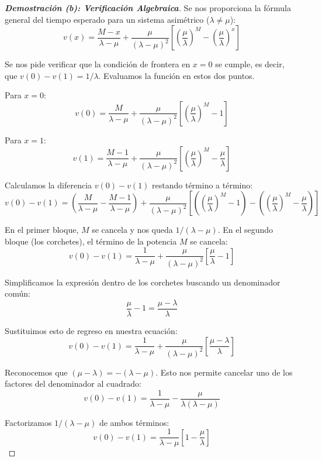 \documentclass[10pt,a4paper]{article}
\begin{document}
\newpage

\begin{proof}[\textbf{Demostración (b): Verificación Algebraica}]
    Se nos proporciona la fórmula general del tiempo esperado para un sistema asimétrico ($\lambda \neq \mu$):
    \[ v(x) = \frac{M-x}{\lambda-\mu} + \frac{\mu}{(\lambda-\mu)^2} \left[ \left(\frac{\mu}{\lambda}\right)^M - \left(\frac{\mu}{\lambda}\right)^x \right] \]
    
    Se nos pide verificar que la condición de frontera en $x=0$ se cumple, es decir, que $v(0) - v(1) = 1/\lambda$. Evaluamos la función en estos dos puntos.
    
    Para $x=0$:
    \[ v(0) = \frac{M}{\lambda-\mu} + \frac{\mu}{(\lambda-\mu)^2} \left[ \left(\frac{\mu}{\lambda}\right)^M - 1 \right] \]
    
    Para $x=1$:
    \[ v(1) = \frac{M-1}{\lambda-\mu} + \frac{\mu}{(\lambda-\mu)^2} \left[ \left(\frac{\mu}{\lambda}\right)^M - \frac{\mu}{\lambda} \right] \]
    
    Calculamos la diferencia $v(0) - v(1)$ restando término a término:
    \[ v(0) - v(1) = \left( \frac{M}{\lambda-\mu} - \frac{M-1}{\lambda-\mu} \right) + \frac{\mu}{(\lambda-\mu)^2} \left[ \left( \left(\frac{\mu}{\lambda}\right)^M - 1 \right) - \left( \left(\frac{\mu}{\lambda}\right)^M - \frac{\mu}{\lambda} \right) \right] \]
    
    En el primer bloque, $M$ se cancela y nos queda $1/(\lambda-\mu)$. En el segundo bloque (los corchetes), el término de la potencia $M$ se cancela:
    \[ v(0) - v(1) = \frac{1}{\lambda-\mu} + \frac{\mu}{(\lambda-\mu)^2} \left[ \frac{\mu}{\lambda} - 1 \right] \]
    
    Simplificamos la expresión dentro de los corchetes buscando un denominador común:
    \[ \frac{\mu}{\lambda} - 1 = \frac{\mu - \lambda}{\lambda} \]
    
    Sustituimos esto de regreso en nuestra ecuación:
    \[ v(0) - v(1) = \frac{1}{\lambda-\mu} + \frac{\mu}{(\lambda-\mu)^2} \left[ \frac{\mu - \lambda}{\lambda} \right] \]
    
    Reconocemos que $(\mu - \lambda) = -(\lambda - \mu)$. Esto nos permite cancelar uno de los factores del denominador al cuadrado:
    \[ v(0) - v(1) = \frac{1}{\lambda-\mu} - \frac{\mu}{\lambda(\lambda-\mu)} \]
    
    Factorizamos $1/(\lambda-\mu)$ de ambos términos:
    \[ v(0) - v(1) = \frac{1}{\lambda-\mu} \left[ 1 - \frac{\mu}{\lambda} \right] \]
    

\end{proof}
\end{document}

